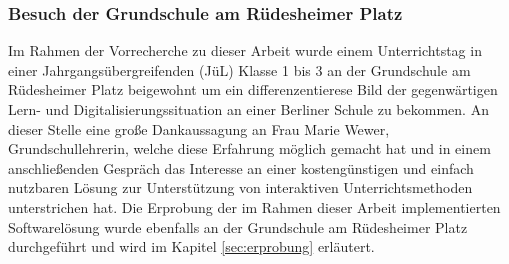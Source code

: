 
\subsubsection{Besuch der Grundschule am Rüdesheimer Platz}
Im Rahmen der Vorrecherche zu dieser Arbeit wurde einem Unterrichtstag in 
einer Jahrgangsübergreifenden (JüL) Klasse 1 bis 3 an der Grundschule am Rüdesheimer Platz beigewohnt um ein differenzentierese 
Bild der gegenwärtigen Lern- und Digitalisierungssituation an einer Berliner Schule zu bekommen. An dieser Stelle eine große Dankaussagung an Frau Marie Wewer, Grundschullehrerin, welche diese Erfahrung möglich gemacht hat und in einem anschließenden Gespräch das Interesse an einer kostengünstigen und einfach nutzbaren Lösung zur Unterstützung von interaktiven Unterrichtsmethoden unterstrichen hat. Die Erprobung der im Rahmen dieser Arbeit implementierten Softwarelösung wurde ebenfalls an der Grundschule am Rüdesheimer Platz durchgeführt und wird im Kapitel \ref{sec:erprobung} erläutert.     
